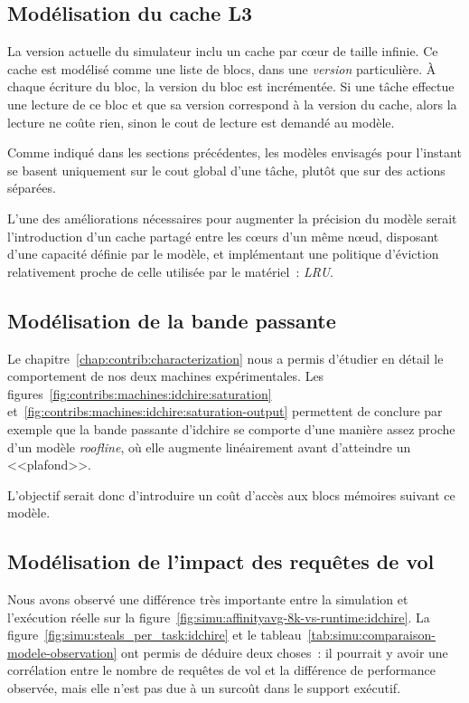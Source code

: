 \subsection{Modélisation du cache L3}

La version actuelle du simulateur inclu un cache par cœur de taille infinie.
Ce cache est modélisé comme une liste de blocs, dans une \emph{version} particulière.
À chaque écriture du bloc, la version du bloc est incrémentée.
Si une tâche effectue une lecture de ce bloc et que sa version correspond à la version du cache, alors la lecture ne coûte rien, sinon le cout de lecture est demandé au modèle.

Comme indiqué dans les sections précédentes, les modèles envisagés pour l'instant se basent uniquement sur le cout global d'une tâche, plutôt que sur des actions séparées.

L'une des améliorations nécessaires pour augmenter la précision du modèle serait l'introduction d'un cache partagé entre les cœurs d'un même nœud, disposant d'une capacité définie par le modèle, et implémentant une politique d'éviction relativement proche de celle utilisée par le matériel~: \emph{LRU}.

\subsection{Modélisation de la bande passante}

Le chapitre~\ref{chap:contrib:characterization} nous a permis d'étudier en détail le comportement de nos deux machines expérimentales.
Les figures~\ref{fig:contribs:machines:idchire:saturation} et~\ref{fig:contribs:machines:idchire:saturation-output} permettent de conclure par exemple que la bande passante d'idchire se comporte d'une manière assez proche d'un modèle \emph{roofline}, où elle augmente linéairement avant d'atteindre un <<plafond>>.

L'objectif serait donc d'introduire un coût d'accès aux blocs mémoires suivant ce modèle.

\subsection{Modélisation de l'impact des requêtes de vol}

Nous avons observé une différence très importante entre la simulation et l'exécution réelle sur la figure~\ref{fig:simu:affinityavg-8k-vs-runtime:idchire}.
La figure~\ref{fig:simu:steals_per_task:idchire} et le tableau~\ref{tab:simu:comparaison-modele-observation} ont permis de déduire deux choses~: il pourrait y avoir une corrélation entre le nombre de requêtes de vol et la différence de performance observée, mais elle n'est pas due à un surcoût dans le support exécutif.

